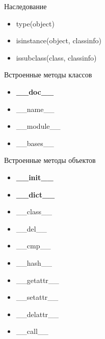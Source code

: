 \documentclass[hyperref={pdftex,unicode}]{beamer}
\begin{document}
\begin{frame}[fragile]{Наследование}
\begin{itemize}
\item type(object)
\item isinstance(object, classinfo)
\item issubclass(class, classinfo)
\end{itemize}
\end{frame}


\begin{frame}{Встроенные методы классов}
  \begin{itemize}
  \item \textbf{\_\_doc\_\_}
  \item \_\_name\_\_
  \item \_\_module\_\_
  \item \_\_bases\_\_
  \end{itemize}
\end{frame}

\begin{frame}{Встроенные методы объектов}
  \begin{itemize}
  \item \textbf{\_\_init\_\_}
  \item \textbf{\_\_dict\_\_}
  \item \_\_class\_\_
  \item \_\_del\_\_
  \item \_\_cmp\_\_
  \item \_\_hash\_\_
  \item \_\_getattr\_\_
  \item \_\_setattr\_\_
  \item \_\_delattr\_\_
  \item \_\_call\_\_
  \end{itemize}
\end{frame}
\end{document}
